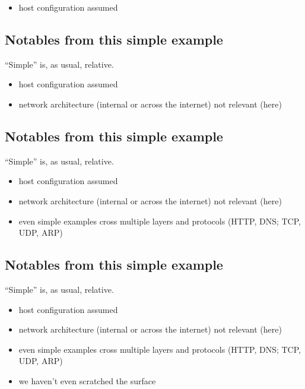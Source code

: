 \documentclass[xga]{xdvislides}
\begin{document}
\begin{itemize}
	\item host configuration assumed
\end{itemize}

\subsection{Notables from this simple example}
``Simple'' is, as usual, relative.
\\

\begin{itemize}
	\item host configuration assumed
	\item network architecture (internal or across the internet) not
			relevant (here)
\end{itemize}

\subsection{Notables from this simple example}
``Simple'' is, as usual, relative.
\\

\begin{itemize}
	\item host configuration assumed
	\item network architecture (internal or across the internet) not
			relevant (here)
	\item even simple examples cross multiple layers and protocols
			(HTTP, DNS; TCP, UDP, ARP)
\end{itemize}

\subsection{Notables from this simple example}
``Simple'' is, as usual, relative.
\\

\begin{itemize}
	\item host configuration assumed
	\item network architecture (internal or across the internet) not
			relevant (here)
	\item even simple examples cross multiple layers and protocols
			(HTTP, DNS; TCP, UDP, ARP)
	\item we haven't even scratched the surface
\end{itemize}
\end{document}
